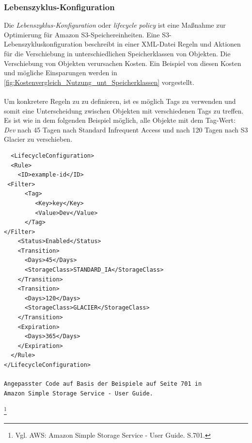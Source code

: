 \subsubsection{Lebenszyklus-Konfiguration}\label{ssec:Lebenszyklus-Konfiguration}
Die \textit{Lebenszyklus-Konfiguration} oder \textit{lifecycle policy} ist eine Maßnahme zur Optimierung für Amazon S3-Speichereinheiten. Eine S3-Lebenszykluskonfiguration beschreibt in einer XML-Datei Regeln und Aktionen für die Verschiebung in unterschiedlichen Speicherklassen von Objekten. Die Verschiebung von Objekten verursachen Kosten. Ein Beispiel von diesen Kosten und mögliche Einsparungen werden in \autoref{fig:Kostenvergleich_Nutzung_unt_Speicherklassen} vorgestellt.
\\\\
Um konkretere Regeln zu zu definieren, ist es möglich Tags zu verwenden und somit eine Unterscheidung zwischen Objekten mit verschiedenen Tags zu treffen. Es ist wie in dem folgenden Beispiel möglich, alle Objekte mit dem Tag-Wert: \textit{Dev} nach 45 Tagen nach Standard Infrequent Access und nach 120 Tagen nach S3 Glacier zu verschieben.
\begin{lstlisting}
  <LifecycleConfiguration>
  <Rule>
    <ID>example-id</ID>
 <Filter>
      <Tag>
         <Key>key</Key>
         <Value>Dev</Value>
      </Tag>
</Filter>
    <Status>Enabled</Status>
    <Transition>
      <Days>45</Days>
      <StorageClass>STANDARD_IA</StorageClass>
    </Transition>
    <Transition>
      <Days>120</Days>
      <StorageClass>GLACIER</StorageClass>
    </Transition>
    <Expiration>
      <Days>365</Days>
    </Expiration>
  </Rule>
</LifecycleConfiguration>

Angepasster Code auf Basis der Beispiele auf Seite 701 in 
Amazon Simple Storage Service - User Guide. 
\end{lstlisting}
\footnote{Vgl. AWS: Amazon Simple Storage Service - User Guide. S.701.\cite{AMZ18}}\\

